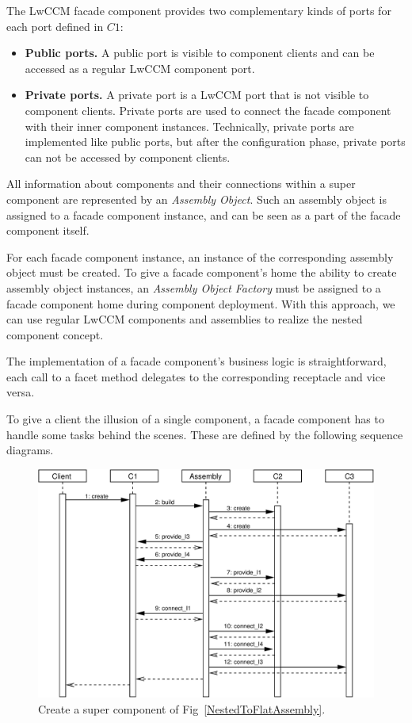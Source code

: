 \noindent
The LwCCM facade component provides two complementary kinds of ports for each 
port defined in $C1$:
\begin{itemize}
\item {\bf Public ports.} A public port is visible to component clients and
can be accessed as a regular LwCCM component port.
 
\item {\bf Private ports.} A private port is a LwCCM port that is
not visible to component clients.
Private ports are used to connect the facade component with their inner 
component instances.
Technically, private ports are implemented like public ports, but after the
configuration phase, private ports can not be accessed by component clients. 
\end{itemize}
 
\noindent
All information about components and their connections within a super 
component are represented by an {\it Assembly Object}.
Such an assembly object is assigned to a facade component instance, and 
can be seen as a part of the facade component itself. 

For each facade component instance, an instance of the corresponding assembly
object must be created. 
To give a facade component's home the ability to create assembly object 
instances, an {\it Assembly Object Factory} must be assigned to a facade 
component home during component deployment.
With this approach, we can use regular LwCCM components and assemblies
to realize the nested component concept.

The implementation of a facade component's business logic is straightforward, 
each call to a facet method delegates to the corresponding receptacle and 
vice versa.

\vspace{3mm}
\noindent
To give a client the illusion of a single component, a facade component has to
handle some tasks behind the scenes. These are defined by the following 
sequence diagrams. 

\begin{figure}[htb]
    \begin{center}
    \includegraphics [width=12cm,angle=0] {ComponentModel/figures/SuperComponentCreate}
    \caption{Create a super component of Fig~\ref{NestedToFlatAssembly}.}
    \label{SuperComponentCreate}
    \end{center}
\end{figure}

